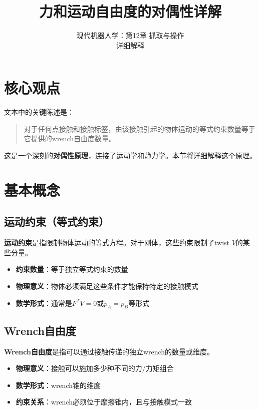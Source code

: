 \documentclass[12pt,a4paper]{article}
\title{力和运动自由度的对偶性详解}
\author{现代机器人学：第12章 抓取与操作\\
详细解释}
\date{}
\begin{document}
\maketitle

\section{核心观点}

文本中的关键陈述是：

\begin{quote}
对于任何点接触和接触标签，由该接触引起的物体运动的等式约束数量等于它提供的wrench自由度数量。
\end{quote}

这是一个深刻的\textbf{对偶性原理}，连接了运动学和静力学。本节将详细解释这个原理。

\section{基本概念}

\subsection{运动约束（等式约束）}

\textbf{运动约束}是指限制物体运动的等式方程。对于刚体，这些约束限制了twist $V$的某些分量。

\begin{itemize}
    \item \textbf{约束数量}：等于独立等式约束的数量
    \item \textbf{物理意义}：物体必须满足这些条件才能保持特定的接触模式
    \item \textbf{数学形式}：通常是$F^T V = 0$或$\dot{p}_A = \dot{p}_B$等形式
\end{itemize}

\subsection{Wrench自由度}

\textbf{Wrench自由度}是指可以通过接触传递的独立wrench的数量或维度。

\begin{itemize}
    \item \textbf{物理意义}：接触可以施加多少种不同的力/力矩组合
    \item \textbf{数学形式}：wrench锥的维度
    \item \textbf{约束关系}：wrench必须位于摩擦锥内，且与接触模式一致
\end{itemize}
\end{document}
